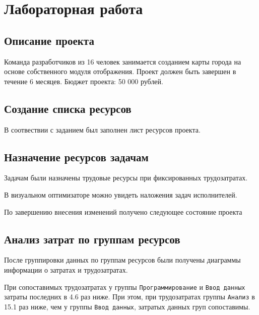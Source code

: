 \chapter{Лабораторная работа}

\section{Описание проекта}

Команда разработчиков из 16 человек занимается созданием карты города на основе собственного модуля отображения. Проект должен быть завершен в течение 6 месяцев. Бюджет проекта: 50 000 рублей.

\section{Создание списка ресурсов}

В соотвествии с заданием был заполнен лист ресурсов проекта.


\section{Назначение ресурсов задачам}

Задачам были назначены трудовые ресурсы при фиксированных трудозатратах.


В визуальном оптимизаторе можно увидеть наложения задач исполнителей.


По завершению внесения изменений получено следующее состояние проекта

\section{Анализ затрат по группам ресурсов}

После группировки данных по группам ресурсов были получены диаграммы информации о затратах и трудозатратах.



При сопоставимых трудозатратах у группы \texttt{Программирование} и \texttt{Ввод данных} затраты последних в 4.6 раз ниже. При этом, при трудозатратах группы \texttt{Анализ} в 15.1 раз ниже, чем у группы \texttt{Ввод данных}, затратых данных груп сопоставимы.